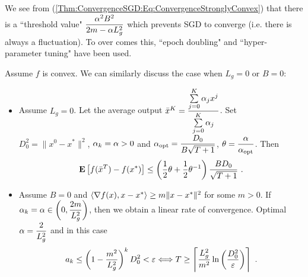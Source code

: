 We see from (\ref{Thm:ConvergenceSGD:Eq:ConvergenceStronglyConvex}) that there is a ``threshold value" $\dfrac{\alpha^2 B^2}{2m-\alpha L_g^2}$ which prevents SGD to converge (i.e. there is always a fluctuation). To over comes this, ``epoch doubling" and ``hyper-parameter tuning" have been used. 

\begin{remark}\label{Remark:ConvergenceSGD:OtherCases}
Assume $f$ is convex. We can similarly discuss the case when $L_g=0$ or $B=0$:
\begin{itemize}
\item[\emph{(1)}] Assume $L_g=0$. Let the average output $\bar{x}^K=\dfrac{\sum\limits_{j=0}^K \alpha_jx^j}{\sum\limits_{j=0}^K \alpha_j}$. Set $D_0^2=\|x^0-x^*\|^2$,  $\alpha_k=\alpha>0$ and $\alpha_{\text{opt}}=\dfrac{D_0}{B\sqrt{T+1}}$, $\theta=\dfrac{\alpha}{\alpha_{\text{opt}}}$. Then
$$\mathbf E\left[f(\bar{x}^T)-f(x^*)\right]\leq \left(\dfrac{1}{2}\theta+\dfrac{1}{2}\theta^{-1}\right)\dfrac{BD_0}{\sqrt{T+1}} \ .$$

\item[\emph{(2)}] Assume $B=0$ and $\langle\nabla f(x), x-x^*\rangle\geq m\|x-x^*\|^2$ for some $m>0$. If $\alpha_k=\alpha\in \left(0, \dfrac{2m}{L_g^2}\right)$, 
then we obtain a linear rate of convergence. Optimal $\alpha=\dfrac{2}{L_g^2}$ and
in this case $$a_k\leq \left(1-\dfrac{m^2}{L_g^2}\right)^kD_0^2< \ve \Longleftrightarrow T\geq \left\lceil 
\dfrac{L_g^2}{m^2}\ln\left(\dfrac{D_0^2}{\ve}\right)\right\rceil \ .$$
\end{itemize}
\end{remark}

